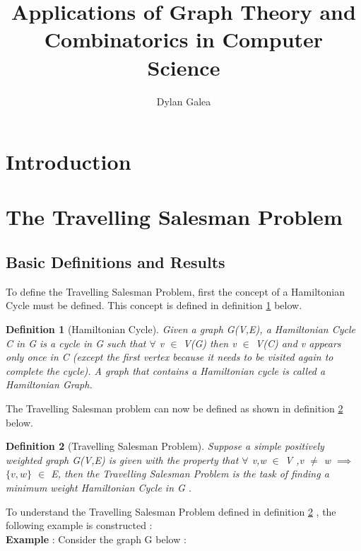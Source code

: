 \documentclass{article}
\title{Applications of Graph Theory and Combinatorics in Computer Science}
\author{Dylan Galea}
\newtheorem{definition}{Definition}[subsection]
\begin{document}
\maketitle
\newpage
\tableofcontents
\newpage
\section{Introduction}
\newpage
\section{The Travelling Salesman Problem}
\subsection{Basic Definitions and Results}
To define the Travelling Salesman Problem, first the concept of a Hamiltonian Cycle must be defined. This concept is defined in definition \ref{Hamiltonian Cycle} below.
\begin{definition}[Hamiltonian Cycle]
\label{Hamiltonian Cycle}
Given a graph G(V,E), a Hamiltonian Cycle C in G is a cycle in G such that $\forall$ v $\in$ V(G) then v $\in$ V(C) and v appears only once in C (except the first vertex because it needs to be visited again to complete the cycle). A graph that contains a Hamiltonian cycle is called a Hamiltonian Graph. \cite{weisstein_2018}
\end{definition}
The Travelling Salesman problem can now be defined as shown in definition \ref{Travelling Salesman Problem} below.
\begin{definition}[Travelling Salesman Problem]
\label{Travelling Salesman Problem}
Suppose a simple positively weighted graph G(V,E) is given with the property that $\forall$ v,w $\in$ V ,v $\ne$ w $\implies$ $\{v,w\}$ $\in$ E, then the Travelling Salesman Problem is the task of finding a minimum weight Hamiltonian Cycle in G \cite{geeksforgeeks_2018}.
\end{definition}
To understand the Travelling Salesman Problem defined in definition \ref{Travelling Salesman Problem} , the following example is constructed :\\
\textbf{Example} : Consider the graph G below :


\end{document}
